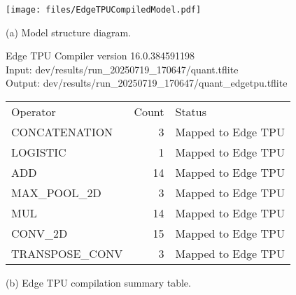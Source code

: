 {\begin{minipage}[t]{0.26\textwidth}\vspace{0pt} %
    \centering
    \texttt{[image: files/EdgeTPUCompiledModel.pdf]}
    \par\smallskip\footnotesize (a) Model structure diagram. %
\end{minipage}%
\hspace{0.5cm plus 1fill} %
\begin{minipage}[t]{0.74\textwidth}\vspace{0pt}
    \vspace*{\fill}        %
    \raggedright           %
    \small

    Edge TPU Compiler version 16.0.384591198\\
    Input: dev/results/run\_20250719\_170647/quant.tflite\\
    Output: dev/results/run\_20250719\_170647/quant\_edgetpu.tflite\\

    \vspace{0.5em}
    \begin{tabular}{@{}lrl@{}}
      Operator & Count & Status \\[0.5em]  %
      CONCATENATION & 3  & Mapped to Edge TPU \\
      LOGISTIC      & 1  & Mapped to Edge TPU \\
      ADD           & 14 & Mapped to Edge TPU \\
      MAX\_POOL\_2D & 3  & Mapped to Edge TPU \\
      MUL           & 14 & Mapped to Edge TPU \\
      CONV\_2D      & 15 & Mapped to Edge TPU \\
      TRANSPOSE\_CONV & 3 & Mapped to Edge TPU
    \end{tabular}

    \par\smallskip\centering\footnotesize (b) Edge TPU compilation summary table. %
    \vspace*{\fill}        %
\end{minipage}


}
